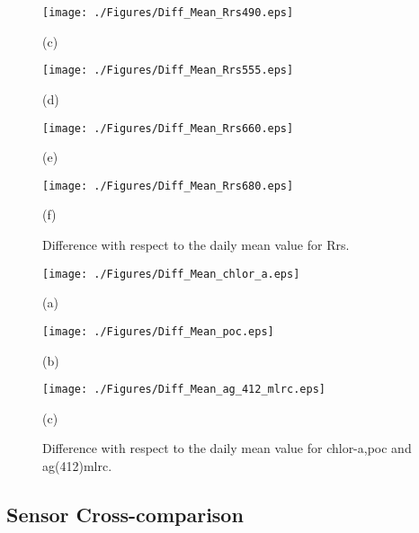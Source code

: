 \documentclass[12pt]{spieman}  %
\begin{document}
\begin{spacing}{2}
\begin{figure}[htb!]
  \begin{minipage}[c]{0.48\linewidth}
      \centering
      \texttt{[image: ./Figures/Diff\_Mean\_Rrs490.eps]}
    \centerline{(c)}\medskip
    \end{minipage}  
    \hfill
    \begin{minipage}[c]{0.48\linewidth}
      \centering
      \texttt{[image: ./Figures/Diff\_Mean\_Rrs555.eps]}
      \centerline{(d)}\medskip
    \end{minipage}  

  \begin{minipage}[c]{0.48\linewidth}
      \centering
      \texttt{[image: ./Figures/Diff\_Mean\_Rrs660.eps]}
      \centerline{(e)}\medskip
    \end{minipage}   
        \hfill
    \begin{minipage}[c]{0.48\linewidth}
      \centering
      \texttt{[image: ./Figures/Diff\_Mean\_Rrs680.eps]}
      \centerline{(f)}\medskip
    \end{minipage} 
    \caption{Difference with respect to the daily mean value for Rrs. \label{fig:DiffDailyMeanRrs} } 
\end{figure}

\begin{figure}[htb!]
    \begin{minipage}[c]{0.33\linewidth}
      \centering
      \texttt{[image: ./Figures/Diff\_Mean\_chlor\_a.eps]}
    \centerline{(a)}\medskip
    \end{minipage}  
    \begin{minipage}[c]{0.33\linewidth}
      \centering
      \texttt{[image: ./Figures/Diff\_Mean\_poc.eps]}
      \centerline{(b)}\medskip
    \end{minipage}  
  	\begin{minipage}[c]{0.33\linewidth}
      \centering
      \texttt{[image: ./Figures/Diff\_Mean\_ag\_412\_mlrc.eps]}
    \centerline{(c)}\medskip
    \end{minipage}  

    \caption{Difference with respect to the daily mean value for chlor-a,poc and ag(412)mlrc. \label{fig:DiffDailyMeanProd} } 
\end{figure}
\subsection{Sensor Cross-comparison}


\end{spacing}
\end{document}
